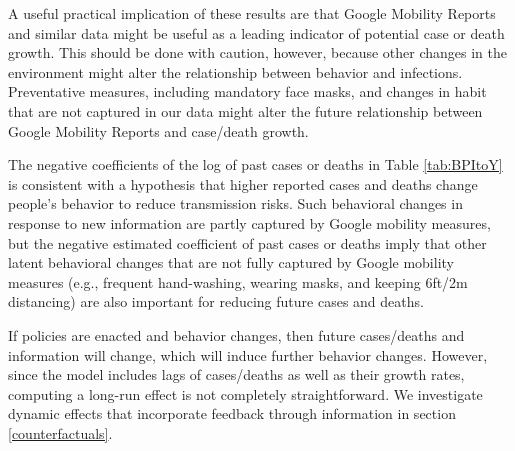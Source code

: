 \documentclass[11pt,reqno,letter]{amsart}
\theoremstyle{definition}
\renewcommand{\to}{{\rightarrow}}
\begin{document}
A useful practical implication of these results are that Google Mobility Reports and similar data might be useful as a leading indicator of potential case or death growth. This should be done with caution, however, because other changes in the environment might alter the relationship between behavior and infections. Preventative measures, including mandatory face masks, and changes in habit that are not captured in our data might alter the future relationship between Google Mobility Reports and case/death growth.

The negative coefficients of the log of past cases or deaths in
Table \ref{tab:BPItoY} is
consistent with a hypothesis that higher reported cases and deaths change people's behavior to reduce transmission risks. Such behavioral changes in response to new information   are  partly captured by Google mobility measures, but the negative estimated coefficient of past cases or deaths imply that other latent behavioral changes that are not fully captured by Google mobility measures (e.g., frequent hand-washing, wearing masks, and keeping 6ft/2m distancing) are also important for reducing future cases and deaths.

If policies are enacted and behavior changes, then future cases/deaths and information will change, which will induce further behavior changes.  However, since the model includes lags of cases/deaths as well as their growth rates,  computing a long-run effect is not completely straightforward. We investigate dynamic effects that incorporate feedback through information in section \ref{counterfactuals}.


%       
\end{document}
